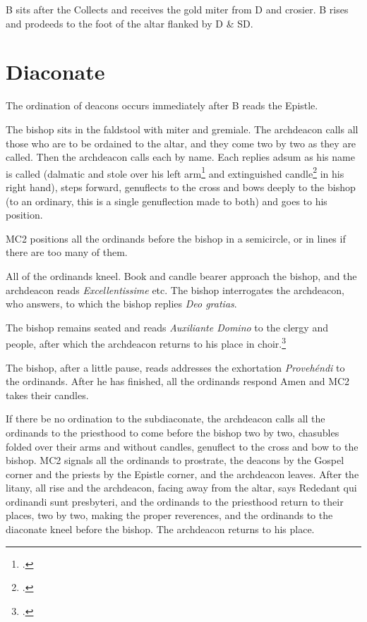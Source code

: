 \documentclass[letterpaper]{report}
\begin{document}
{    \rubric B sits after the Collects and receives the gold miter from D and
    crosier. B rises and prodeeds to the foot of the altar flanked by D \& SD. 


    \section{Diaconate}

    \rubric The ordination of deacons occurs immediately after B reads the
    Epistle.

    \rubric The bishop sits in the faldstool with miter and gremiale. The
    archdeacon calls all those who are to be ordained to the altar, and they
    come two by two as they are called. Then the archdeacon calls each by name.
    Each replies adsum as his name is called (dalmatic and stole over his left
    arm\footcite[The ordinands can also hold the stoles in their left hands,
    and have their dalmatics draped over their left arms.][]{levav:ordinations}
    and extinguished candle\footcite[It appears that the candles could be lit,
    or are customarily lit in some places.][]{levav:ordinations} in his right
    hand), steps forward, genuflects to the cross and bows deeply to the bishop
    (to an ordinary, this is a single genuflection made to both) and goes to
    his position. 

    \rubric MC2 positions all the ordinands before the bishop in a semicircle,
    or in lines if there are too many of them.

    \rubric All of the ordinands kneel. Book and candle bearer approach the
    bishop, and the archdeacon reads \textit{Excellentissime} etc. The bishop
    interrogates the archdeacon, who answers, to which the bishop replies
    \textit{Deo gratias}. 

    \rubric The bishop remains seated and reads \textit{Auxiliante Domino} to
    the clergy and people, after which the archdeacon returns to his place in
    choir.\footcite[Le Vavasseur has the archdeacon return to his place
    immediately after \textit{Deo gratias.}][]{levav:ordinations}

    \rubric The bishop, after a little pause, reads addresses the exhortation
    \textit{Provehéndi} to the ordinands. After he has finished, all the
    ordinands respond Amen and MC2 takes their candles. 

    \rubric If there be no ordination to the subdiaconate, the archdeacon calls
    all the ordinands to the priesthood to come before the bishop two by two,
    chasubles folded over their arms and without candles, genuflect to the
    cross and bow to the bishop. MC2 signals all the ordinands to prostrate,
    the deacons by the Gospel corner and the priests by the Epistle corner, and
    the archdeacon leaves. After the litany, all rise and the archdeacon,
    facing away from the altar, says Rededant qui ordinandi sunt presbyteri,
    and the ordinands to the priesthood return to their places, two by two,
    making the proper reverences, and the ordinands to the diaconate kneel
    before the bishop. The archdeacon returns to his place.

}
\end{document}

